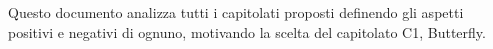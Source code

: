 Questo documento analizza tutti i capitolati proposti definendo gli aspetti positivi e negativi
di ognuno, motivando la scelta del capitolato C1, Butterfly.